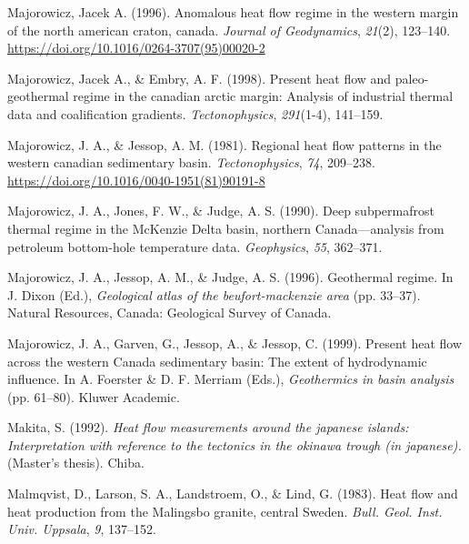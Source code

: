 \documentclass[draft,linenumbers]{agujournal2018}
\begin{document}
\leavevmode{}%
Majorowicz, Jacek A. (1996). Anomalous heat flow regime in the western
margin of the north american craton, canada. \emph{Journal of
Geodynamics}, \emph{21}(2), 123--140.
\url{https://doi.org/10.1016/0264-3707(95)00020-2}

\leavevmode{}%
Majorowicz, Jacek A., \& Embry, A. F. (1998). Present heat flow and
paleo-geothermal regime in the canadian arctic margin: Analysis of
industrial thermal data and coalification gradients.
\emph{Tectonophysics}, \emph{291}(1-4), 141--159.

\leavevmode{}%
Majorowicz, J. A., \& Jessop, A. M. (1981). Regional heat flow patterns
in the western canadian sedimentary basin. \emph{Tectonophysics},
\emph{74}, 209--238. \url{https://doi.org/10.1016/0040-1951(81)90191-8}

\leavevmode{}%
Majorowicz, J. A., Jones, F. W., \& Judge, A. S. (1990). Deep
subpermafrost thermal regime in the {McKenzie Delta} basin, northern
{Canada}---analysis from petroleum bottom-hole temperature data.
\emph{Geophysics}, \emph{55}, 362--371.

\leavevmode{}%
Majorowicz, J. A., Jessop, A. M., \& Judge, A. S. (1996). Geothermal
regime. In J. Dixon (Ed.), \emph{Geological atlas of the
beufort-mackenzie area} (pp. 33--37). Natural Resources, Canada:
Geological Survey of Canada.

\leavevmode{}%
Majorowicz, J. A., Garven, G., Jessop, A., \& Jessop, C. (1999). Present
heat flow across the western {Canada} sedimentary basin: The extent of
hydrodynamic influence. In A. Foerster \& D. F. Merriam (Eds.),
\emph{Geothermics in basin analysis} (pp. 61--80). Kluwer Academic.

\leavevmode{}%
Makita, S. (1992). \emph{Heat flow measurements around the japanese
islands: Interpretation with reference to the tectonics in the okinawa
trough (in japanese).} (Master's thesis). Chiba.

\leavevmode{}%
Malmqvist, D., Larson, S. A., Landstroem, O., \& Lind, G. (1983). Heat
flow and heat production from the {Malingsbo} granite, central {Sweden}.
\emph{Bull. Geol. Inst. Univ. Uppsala}, \emph{9}, 137--152.
\end{document}
